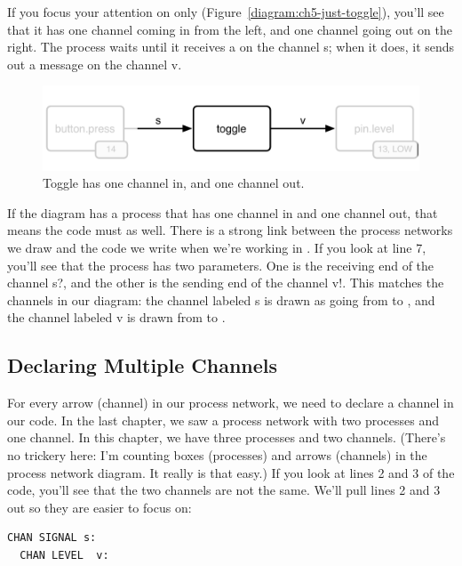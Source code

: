 If you focus your attention on \toggle only (Figure~\vref{diagram:ch5-just-toggle}), you'll see that it has one channel coming in from the left, and one channel going out on the right. The \toggle process waits until it receives a \SIGNALV on the channel {\code s}; when it does, it sends out a message on the channel {\code v}. 

\begin{figure}[h]
  \begin{center}
    \includegraphics[width=\linewidth]{images/ch5-just-toggle}
    \caption{Toggle has one channel in, and one channel out.}
    \label{diagram:ch5-just-toggle}
  \end{center}
\end{figure}

If the diagram has a process that has one channel in and one channel out, that means the code must as well. There is a strong link between the process networks we draw and the code we write when we're working in \plumbing. If you look at line 7, you'll see that the process \toggle has two parameters. One is the receiving end of the channel {\code s?}, and the other is the sending end of the channel {\code v!}. This matches the channels in our diagram: the channel labeled {\code s} is drawn as going from \bp to \toggle, and the channel labeled {\code v} is drawn from \toggle to \pl.

\subsection{Declaring Multiple Channels}
For every arrow (channel) in our process network, we need to declare a channel in our code. In the last chapter, we saw a process network with two processes and one channel. In this chapter, we have three processes and two channels. (There's no trickery here: I'm counting boxes (processes) and arrows (channels) in the process network diagram. It really is that easy.) If you look at lines 2 and 3 of the code, you'll see that the two channels are not the same. We'll pull lines 2 and 3 out so they are easier to focus on:

\begin{lstlisting}[firstnumber=2]
  CHAN SIGNAL s:
  CHAN LEVEL  v:
\end{lstlisting}
	
